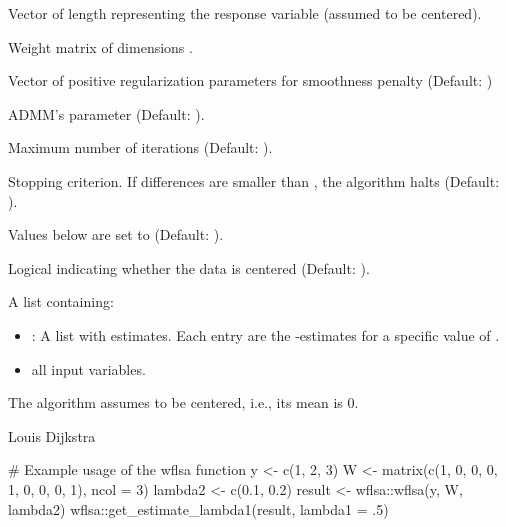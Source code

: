 \documentclass[a4paper]{book}
\begin{document}
\begin{Arguments}
\begin{ldescription}
\item[\code{y}] Vector of length  representing the response variable (assumed to be centered).

\item[\code{W}] Weight matrix of dimensions .

\item[\code{lambda2}] Vector of positive regularization parameters for smoothness penalty (Default: )

\item[\code{rho}] ADMM's parameter (Default: ).

\item[\code{max\_iter}] Maximum number of iterations (Default: ).

\item[\code{eps}] Stopping criterion. If differences are smaller than , 
the algorithm halts (Default: ).

\item[\code{truncate}] Values below  are set to  (Default: ).

\item[\code{offset}] Logical indicating whether the data is centered (Default: ).
\end{ldescription}
\end{Arguments}
%
\begin{Value}
A list containing:
\begin{itemize}

\item{} : A list with estimates. Each entry are the \eqn{\beta}{}-estimates
for a specific value of . 
\item{} all input variables.

\end{itemize}

\end{Value}
%
\begin{Note}\relax
{} The algorithm assumes  to be centered, i.e., its mean is 0.
\end{Note}
%
\begin{Author}\relax
Louis Dijkstra
\end{Author}
%
\begin{SeeAlso}\relax
{}
\end{SeeAlso}
%
\begin{Examples}
\begin{ExampleCode}
# Example usage of the wflsa function
y <- c(1, 2, 3)
W <- matrix(c(1, 0, 0, 0, 1, 0, 0, 0, 1), ncol = 3)
lambda2 <- c(0.1, 0.2)
result <- wflsa::wflsa(y, W, lambda2)
wflsa::get_estimate_lambda1(result, lambda1 = .5)
\end{ExampleCode}
\end{Examples}
\printindex{}
\end{document}
